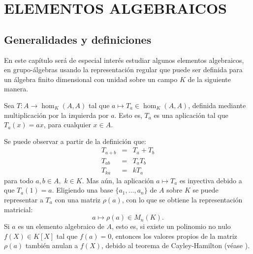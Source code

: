\chapter{ELEMENTOS ALGEBRAICOS}

\section{\quad Generalidades y definiciones}
En este capítulo será de especial interés estudiar algunos elementos algebraicos, en grupo-álgebras usando la representación regular que puede ser definida para un álgebra finito dimensional con unidad sobre un campo $K$ de la siguiente manera.

\begin{definicion}
Sea $T \colon A \to \hom_K(A,A)$ tal que $a \mapsto T_a \in \hom_K(A,A)$, definida mediante multiplicación por la izquierda por $a$. Esto es, $T_a$ es una aplicación tal que $T_a(x) = ax$, para cualquier $x \in A$.  
\end{definicion}

Se puede observar a partir de la definición que:
\begin{eqnarray*}
T_{a+b} &=& T_a + T_b \\
T_{ab} &=& T_aT_b \\
T_{ka} &=& kT_a
\end{eqnarray*}
para todo $a,b \in A,$  $k\in K$. Mas aún, la aplicación $a \mapsto T_a$ es inyectiva debido a que $T_a(1) = a$. Eligiendo una base $\{ a_1, \dots, a_n \}$ de $A$ sobre $K$ se puede representar a $T_a$ con una matriz $\rho(a)$, con lo que  se obtiene la representación matricial:
\begin{equation*}
a \mapsto \rho(a) \in M_n(K).
\end{equation*}
\indent Si $a$ es un elemento algebraico de $A$, esto es, si existe un polinomio no nulo $f(X) \in K[X]$ tal que $f(a) = 0$, entonces los valores propios de la matriz $\rho(a)$ también anulan a $f(X)$, debido al teorema de Cayley-Hamilton (véase \cite[241]{bib:lang}). 

